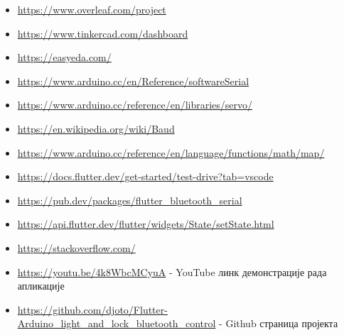\documentclass[12pt]{article}
\begin{document}
\begin{itemize}
  \item \url{https://www.overleaf.com/project}
  \item \url{https://www.tinkercad.com/dashboard}
  \item \url{https://easyeda.com/}
  \item \url{https://www.arduino.cc/en/Reference/softwareSerial}
  \item \url{https://www.arduino.cc/reference/en/libraries/servo/}
  \item \url{https://en.wikipedia.org/wiki/Baud}
  \item \url{https://www.arduino.cc/reference/en/language/functions/math/map/}
  \item \url{https://docs.flutter.dev/get-started/test-drive?tab=vscode}
  \item \url{https://pub.dev/packages/flutter\_bluetooth\_serial}
  \item \url{https://api.flutter.dev/flutter/widgets/State/setState.html}
  \item \url{https://stackoverflow.com/}
  \item \url{https://youtu.be/4k8WbcMCyuA} - YouTube линк демонстрације рада апликације
  \item \url{https://github.com/djoto/Flutter-Arduino_light_and_lock_bluetooth_control} - Github страница пројекта
\end{itemize}
\end{document}

